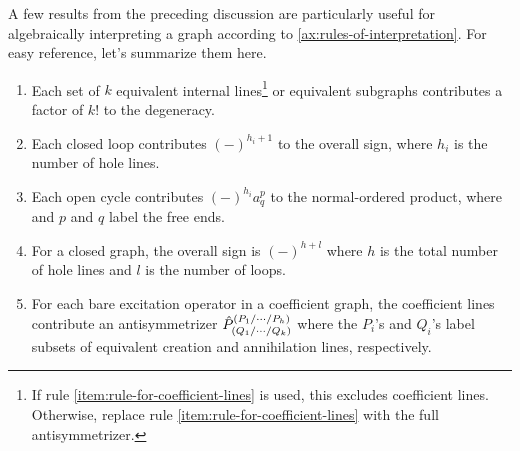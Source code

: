 \documentclass[11pt]{article}
\numberwithin{equation}{section}
\begin{document}
\begin{rmk}\label{rmk:useful-rules}
A few results from the preceding discussion are particularly useful for algebraically interpreting a graph according to \cref{ax:rules-of-interpretation}.
For easy reference, let's summarize them here.
\begin{enumerate}
\item
  Each set of $k$ equivalent internal lines\footnote{If rule \ref{item:rule-for-coefficient-lines} is used, this excludes coefficient lines.  Otherwise, replace rule \ref{item:rule-for-coefficient-lines} with the full antisymmetrizer.} or equivalent subgraphs contributes a factor of $k!$ to the degeneracy.
\item
  Each closed loop contributes $(-)^{h_i+1}$ to the overall sign, where $h_i$ is the number of hole lines.
\item
  Each open cycle contributes $(-)^{h_i}a^p_q$ to the normal-ordered product, where and $p$ and $q$ label the free ends.
\item
  For a closed graph, the overall sign is $(-)^{h+l}$ where $h$ is the total number of hole lines and $l$ is the number of loops.
\item\label{item:rule-for-coefficient-lines}
  For each bare excitation operator in a coefficient graph, the coefficient lines contribute an antisymmetrizer
  $\hat{P}^{(P_1/\cdots /P_h)}_{(Q_1/\cdots /Q_k)}$
  where the $P_i$'s and $Q_i$'s label subsets of equivalent creation and annihilation lines, respectively.
\end{enumerate}
\end{rmk}
\end{document}
